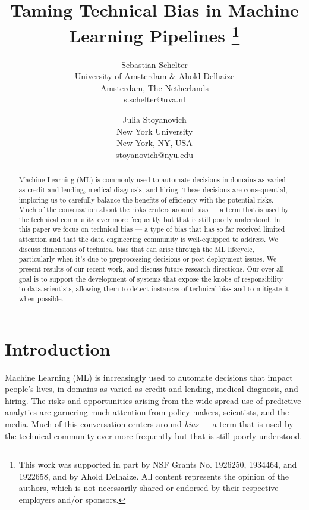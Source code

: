 \documentclass[11pt]{article}
\begin{document}
\title{Taming Technical Bias in Machine Learning Pipelines
\footnote{This work was supported in part by NSF Grants No. 1926250, 1934464, and 1922658, and by Ahold Delhaize. All content represents the opinion of the authors, which is not necessarily shared or endorsed by their respective employers and/or sponsors.}}

\author{
Sebastian Schelter\\
University of Amsterdam \& Ahold Delhaize\\
Amsterdam, The Netherlands \\
s.schelter@uva.nl
\and
 Julia Stoyanovich \\
New York University \\
New York, NY, USA \\
stoyanovich@nyu.edu}

\maketitle

\begin{abstract}
Machine Learning (ML) is commonly used to automate decisions in domains as varied as credit and lending,  medical diagnosis, and  hiring.  These decisions are consequential, imploring us to carefully balance the benefits of efficiency with the potential risks.   Much of the conversation about the risks centers around bias --- a term that is used by the technical community ever more frequently but that is still poorly understood. 
In this paper we focus on technical bias --- a type of bias that has so far received limited attention and that the data engineering community is well-equipped to address. We discuss dimensions of technical bias that can arise through the ML lifecycle, particularly when it's due to preprocessing decisions or post-deployment issues.  We present results of our recent work, and discuss future research directions. Our over-all goal is to support the development of systems that  expose the knobs of responsibility to data scientists, allowing them to detect instances of technical bias and to mitigate it when possible.
\end{abstract}

\section{Introduction}
\label{sec:intro}

Machine Learning (ML) is increasingly used to automate  decisions that impact people's lives, in domains as varied as credit and lending,  medical diagnosis, and  hiring. The risks and opportunities arising from the wide-spread use of predictive analytics are garnering much attention from policy makers, scientists, and the media.  Much of this conversation centers around \emph{bias} --- a term that is used by the technical community ever more frequently but that is still poorly understood. 
\end{document}
